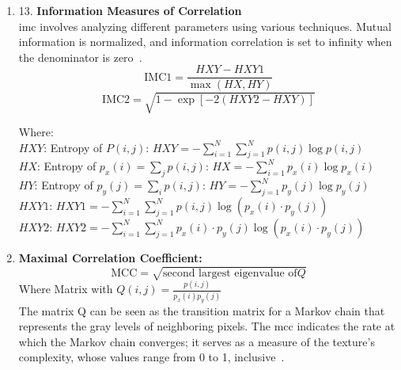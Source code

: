 \begin{enumerate}
    \item 13. \textbf{Information Measures of Correlation}\\
    \acf{imc} involves analyzing different parameters using various techniques. Mutual information is normalized, and information correlation is set to infinity when the denominator is zero~\cite{oprisan_bounds_2023}.
        \begin{equation}
            \text{IMC1} = \frac{HXY - HXY1}{\max(HX, HY)}
        \end{equation}
        \begin{equation}
            \text{IMC2} = \sqrt{1 - \exp[-2(HXY2 - HXY)]}
        \end{equation}

    Where: \\
        $HXY$: Entropy of $P(i,j)$: $HXY = - \sum_{i=1}^{N} \sum_{j=1}^{N} p(i,j) \log p(i,j)$ \\
        $HX$: Entropy of $p_x(i) = \sum_{j} p(i,j)$: $HX = -    \sum_{i=1}^{N} p_x(i) \log p_x(i)$ \\
        $HY$: Entropy of $p_y(j) = \sum_{i} p(i,j)$: $HY = - \sum_{j=1}^{N} p_y(j) \log p_y(j)$ \\
        $HXY1$: $HXY1 = - \sum_{i=1}^{N} \sum_{j=1}^{N} p(i,j) \log \left( p_x(i) \cdot p_y(j) \right)$ \\
        $HXY2$: $HXY2 = - \sum_{i=1}^{N} \sum_{j=1}^{N} p_x(i) \cdot p_y(j) \log \left( p_x(i) \cdot p_y(j) \right)$ \\
    \setcounter{enumi}{13}
    
    \item \textbf{Maximal Correlation Coefficient:}\\
        \begin{equation}
            \text{MCC} = \sqrt{\text{second largest eigenvalue of} Q}
        \end{equation}
    Where Matrix with $Q(i,j) = \frac{p(i,j)}{p_x(i)p_y(j)}$ \\
    
    The matrix Q can be seen as the transition matrix for a Markov chain that represents the gray levels of neighboring pixels. The \acf{mcc} indicates the rate at which the Markov chain converges; it serves as a measure of the texture's complexity, whose values range from 0 to 1, inclusive~\cite{oprisan_bounds_2023}.
\end{enumerate}



